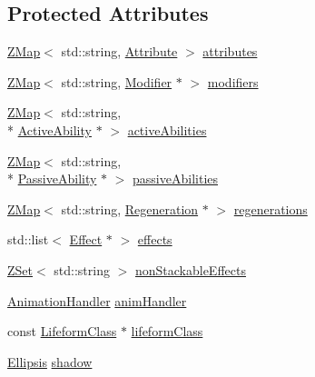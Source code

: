 \subsection*{Protected Attributes}
\begin{DoxyCompactItemize}
\item 
\hyperlink{namespaceZeta_a9af2e12c4e432d2a1725f19e5a648a04}{Z\+Map}$<$ std\+::string, \hyperlink{classZeta_1_1Attribute}{Attribute} $>$ \hyperlink{classZeta_1_1Lifeform_a0bac715f4ec7912886826a9147c22a72}{attributes}
\item 
\hyperlink{namespaceZeta_a9af2e12c4e432d2a1725f19e5a648a04}{Z\+Map}$<$ std\+::string, \hyperlink{classZeta_1_1Modifier}{Modifier} $\ast$ $>$ \hyperlink{classZeta_1_1Lifeform_a014f732d966378c29874a6e021650115}{modifiers}
\item 
\hyperlink{namespaceZeta_a9af2e12c4e432d2a1725f19e5a648a04}{Z\+Map}$<$ std\+::string, \\*
\hyperlink{classZeta_1_1ActiveAbility}{Active\+Ability} $\ast$ $>$ \hyperlink{classZeta_1_1Lifeform_aa0877b745f61e351278ce84ac7411084}{active\+Abilities}
\item 
\hyperlink{namespaceZeta_a9af2e12c4e432d2a1725f19e5a648a04}{Z\+Map}$<$ std\+::string, \\*
\hyperlink{classZeta_1_1PassiveAbility}{Passive\+Ability} $\ast$ $>$ \hyperlink{classZeta_1_1Lifeform_ae0a3b754094ebfb05ccb74a78a657f85}{passive\+Abilities}
\item 
\hyperlink{namespaceZeta_a9af2e12c4e432d2a1725f19e5a648a04}{Z\+Map}$<$ std\+::string, \hyperlink{classZeta_1_1Regeneration}{Regeneration} $\ast$ $>$ \hyperlink{classZeta_1_1Lifeform_ae52c17b261ae604b6d397250d1880e60}{regenerations}
\item 
std\+::list$<$ \hyperlink{classZeta_1_1Effect}{Effect} $\ast$ $>$ \hyperlink{classZeta_1_1Lifeform_ae4dfca2529755e270ba2f498e7271dec}{effects}
\item 
\hyperlink{namespaceZeta_a92c229b4db6ab7275c2b7f32bdfabc87}{Z\+Set}$<$ std\+::string $>$ \hyperlink{classZeta_1_1Lifeform_ab5307139ec0eef6369f5cf64766ead24}{non\+Stackable\+Effects}
\item 
\hyperlink{classZeta_1_1AnimationHandler}{Animation\+Handler} \hyperlink{classZeta_1_1Lifeform_a4ff129ee1b26d50bb69a96e2eea07d49}{anim\+Handler}
\item 
const \hyperlink{classZeta_1_1LifeformClass}{Lifeform\+Class} $\ast$ \hyperlink{classZeta_1_1Lifeform_a20a9acf52939d7b191511c4556dc9d4c}{lifeform\+Class}
\item 
\hyperlink{classZeta_1_1Ellipsis}{Ellipsis} \hyperlink{classZeta_1_1Lifeform_a29237d06af5397c6c01d75eba15a19ae}{shadow}

\end{DoxyCompactItemize}
